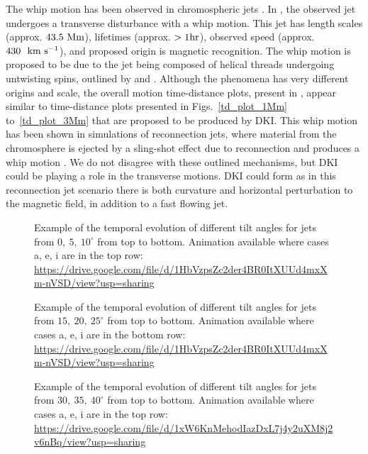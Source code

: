 %
The whip motion has been observed in chromospheric jets \citep{Liu2009ApJ707L37L}. In \cite{Liu2009ApJ707L37L}, the observed jet undergoes a transverse disturbance with a whip motion. This jet has length scales (approx. $43.5~\rm{Mm}$), lifetimes (approx. $>1\rm{hr}$), observed speed (approx. $430~~\rm{km ~s^{-1}}$), and proposed origin is magnetic recognition. The whip motion is proposed to be due to the jet being composed of helical threads undergoing untwisting spins, outlined by \cite{Shibata1985PASJ3731S, Shibata1986SoPh103299S} and \cite{Canfield1996ApJ4641016C}. Although the phenomena has very different origins and scale, the overall motion time-distance plots, present in \cite{Liu2009ApJ707L37L}, appear similar to time-distance plots presented in Figs.~\ref{td_plot_1Mm} to~\ref{td_plot_3Mm} that are proposed to be produced by DKI. This whip motion has been shown in simulations of reconnection jets, where material from the chromosphere is ejected by a sling-shot effect due to reconnection and produces a whip motion \citep{Yokoyama1996PASJ48353Y, Kotani2020PASJ7275K}. We do not disagree with these outlined mechanisms, but DKI could be playing a role in the transverse motions. DKI could form as in this reconnection jet scenario there is both curvature and horizontal perturbation to the magnetic field, in addition to a fast flowing jet. \np
\begin{figure}
\captionsetup[subfigure]{labelformat=empty}
\centering
{}
\caption{Example of the temporal evolution of different tilt angles for jets from $0,~5,~10^{\circ}$ from top to bottom. Animation available where cases a, e, i are in the top row: \url{https://drive.google.com/file/d/1HbVzpsZc2der4BR0ItXUUd4mxXm-nVSD/view?usp=sharing} }
\label{tj_morph_1}
\end{figure}
\begin{figure}
\captionsetup[subfigure]{labelformat=empty}
\centering
{}
\caption{Example of the temporal evolution of different tilt angles for jets from $15,~20,~25^{\circ}$ from top to bottom. Animation available where cases a, e, i are in the bottom row: \url{https://drive.google.com/file/d/1HbVzpsZc2der4BR0ItXUUd4mxXm-nVSD/view?usp=sharing}}
\label{tj_morph_2}
\end{figure}
\begin{figure}
\captionsetup[subfigure]{labelformat=empty}
\centering
{}
\caption{Example of the temporal evolution of different tilt angles for jets from $30,~35,~40^{\circ}$ from top to bottom. Animation available where cases a, e, i are in the top row: \url{https://drive.google.com/file/d/1xW6KnMehodIazDxL7j4y2uXM8j2v6nBq/view?usp=sharing}}
\label{tj_morph_3}
\end{figure}
